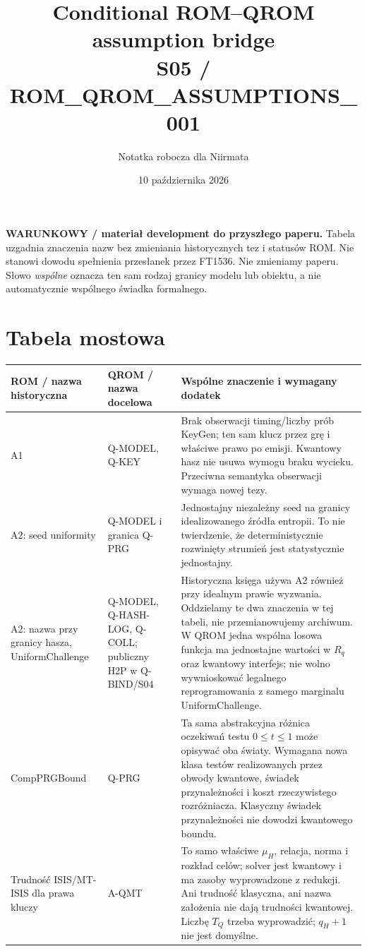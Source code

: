\documentclass[11pt,a4paper]{article}
\title{Conditional ROM--QROM assumption bridge\\\large S05 / ROM\_QROM\_ASSUMPTIONS\_001}
\author{Notatka robocza dla Niirmata}\date{10 października 2026}
\begin{document}
\maketitle
\textbf{WARUNKOWY / materiał development do przyszłego paperu.}
Tabela uzgadnia znaczenia nazw bez zmieniania historycznych tez i statusów ROM.
Nie stanowi dowodu spełnienia przesłanek przez FT1536. Nie zmieniamy paperu.
Słowo \emph{wspólne} oznacza ten sam rodzaj granicy modelu lub obiektu,
a nie automatycznie wspólnego świadka formalnego.

\section{Tabela mostowa}
\small
\begin{longtable}{@{}p{.20\linewidth}p{.23\linewidth}p{.51\linewidth}@{}}
\toprule ROM / nazwa historyczna & QROM / nazwa docelowa & Wspólne znaczenie i wymagany dodatek \\\midrule\endhead
A1 & Q-MODEL, Q-KEY & Brak obserwacji timing/liczby prób KeyGen; ten sam
klucz przez grę i właściwe prawo po emisji. Kwantowy hasz nie usuwa wymogu
braku wycieku. Przeciwna semantyka obserwacji wymaga nowej tezy.\\
A2: seed uniformity & Q-MODEL i granica Q-PRG & Jednostajny niezależny seed
na granicy idealizowanego źródła entropii. To nie twierdzenie, że deterministycznie
rozwinięty strumień jest statystycznie jednostajny.\\
A2: nazwa przy granicy hasza, UniformChallenge & Q-MODEL, Q-HASH-LOG,
Q-COLL; publiczny H2P w Q-BIND/S04 & Historyczna księga używa A2 również
przy idealnym prawie wyzwania. Oddzielamy te dwa znaczenia w tej tabeli,
nie przemianowujemy archiwum. W QROM jedna wspólna losowa funkcja ma
jednostajne wartości w $R_q$ oraz kwantowy interfejs; nie wolno wywnioskować
legalnego reprogramowania z samego marginalu UniformChallenge.\\
CompPRGBound & Q-PRG & Ta sama abstrakcyjna różnica oczekiwań testu
$0\le t\le1$ może opisywać oba światy. Wymagana nowa klasa testów realizowanych
przez obwody kwantowe, świadek przynależności i koszt rzeczywistego rozróżniacza.
Klasyczny świadek przynależności nie dowodzi kwantowego boundu.\\
Trudność ISIS/MT-ISIS dla prawa kluczy & A-QMT & To samo właściwe $\mu_H$,
relacja, norma i rozkład celów; solver jest kwantowy i ma zasoby wyprowadzone
z redukcji. Ani trudność klasyczna, ani nazwa założenia nie dają trudności
kwantowej. Liczbę $T_Q$ trzeba wyprowadzić; $q_H+1$ nie jest domyślne.\\

\end{longtable}
\end{document}
